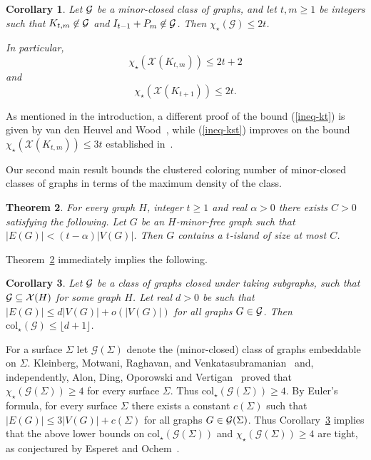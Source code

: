 \documentclass[12pt]{article}
\newcommand{\GG}{{\cal G}}
\newtheorem{theorem}{Theorem}
\newtheorem{corollary}[theorem]{Corollary}
\newcommand{\col}{\text{col}}
\newcommand{\mc}[1]{\mathcal{#1}}
\begin{document}
\begin{corollary}\label{cor-double} 
Let $\GG$ be a minor-closed class of graphs, and let $t,m\ge 1$ be integers such that
$K_{t,m}\not\in \GG$ and $I_{t-1}+P_m\not\in\GG$. Then $\chi_\star(\mc{G}) \leq 2t$. 

In particular, \begin{equation}\label{ineq-kst}
\chi_\star(\mc{X}(K_{t,m})) \leq 2t+2
\end{equation} and 
\begin{equation}\label{ineq-kt}
\chi_\star(\mc{X}(K_{t+1})) \leq 2t.
\end{equation}
\end{corollary}

As mentioned in the introduction, a different proof of the bound (\ref{ineq-kt}) is given by van den Heuvel and Wood~\cite{vdHW17}, while (\ref{ineq-kst}) improves on the bound $\chi_\star(\mc{X}(K_{t,m})) \leq 3t$ established in~\cite{vdHW17}.

\vskip 10pt

Our second main result bounds the clustered coloring number of minor-closed classes of graphs in terms of the maximum density of the class.

\begin{theorem}\label{thm-sparse}
For every graph $H$, integer $t \geq 1$  and  real $\alpha > 0$ there exists $C > 0$ satisfying the following. Let $G$ be an $H$-minor-free graph such that $|E(G)|< (t-\alpha)|V(G)|$. Then $G$ contains a $t$-island of size at most $C$.  
\end{theorem} 

Theorem~\ref{thm-sparse} immediately implies the following.

\begin{corollary}\label{cor-sparse}
Let $\GG$ be a class of graphs closed under taking subgraphs, such that $\GG \subseteq \mc{X}(H)$ for some graph $H$. Let real $d > 0$ be such that $|E(G)|\leq d|V(G)|+o(|V(G)|)$ for all graphs $G\in\GG$. Then $\col_\star(\mc{G}) \leq  \lfloor d+1 \rfloor$.
\end{corollary}

For a surface $\Sigma$ let $\mc{G}(\Sigma)$ denote the (minor-closed) class of graphs embeddable on $\Sigma$. 
Kleinberg, Motwani,
Raghavan, and Venkatasubramanian~\cite{KMRV97} and, independently, Alon, Ding, Oporowski and Vertigan~\cite{ADOV03} proved that $\chi_\star(\mc{G}(\Sigma)) \geq 4$ for every surface $\Sigma$. Thus $\col_\star(\mc{G}(\Sigma)) \geq 4$. By Euler's formula, for every surface $\Sigma$ there exists a constant $c(\Sigma)$ such that $|E(G)| \leq 3|V(G)|+c(\Sigma)$ for all graphs $G\in\GG(\Sigma)$. Thus Corollary~\ref{cor-sparse} implies that the above lower bounds on 
  $\col_\star(\mc{G}(\Sigma))$ and $\chi_\star(\mc{G}(\Sigma)) \geq 4$ are  tight, as conjectured by Esperet and Ochem~\cite[Conjecture 3]{EspOch16}.
  
\end{document}
